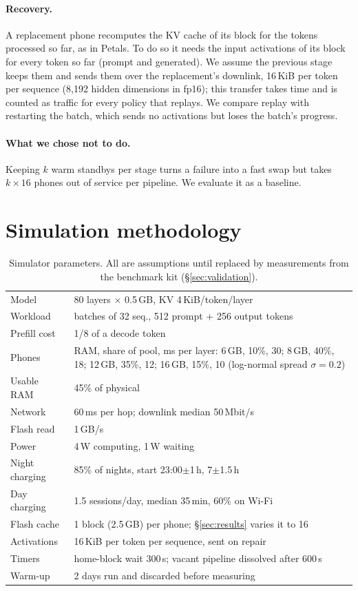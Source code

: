 \documentclass[sigconf,nonacm]{acmart}
\begin{document}
\paragraph{Recovery.} A replacement phone recomputes the KV cache of its block
for the tokens processed so far, as in Petals. To do so it needs the input
activations of its block for every token so far (prompt and generated). We
assume the previous stage keeps them and sends them over the replacement's
downlink, 16\,KiB per token per sequence (8,192 hidden dimensions in fp16);
this transfer takes time and is counted as traffic for every policy that
replays. We compare replay with restarting the batch, which sends no
activations but loses the batch's progress.

\paragraph{What we chose not to do.} Keeping $k$ warm standbys per stage turns a
failure into a fast swap but takes $k\times16$ phones out of service per
pipeline. We evaluate it as a baseline.

\section{Simulation methodology}
\label{sec:method}

\begin{table}[t]
\caption{Simulator parameters. All are assumptions until replaced by
measurements from the benchmark kit (\S\ref{sec:validation}).}
\label{tab:params}
\small
\begin{tabular}{@{}p{}p{}@{}}
\toprule
Model & 80 layers $\times$ 0.5\,GB, KV 4\,KiB/token/layer\\
Workload & batches of 32 seq., 512 prompt + 256 output tokens\\
Prefill cost & 1/8 of a decode token\\
Phones & RAM, share of pool, ms per layer: 6\,GB, 10\%, 30; 8\,GB, 40\%, 18; 12\,GB, 35\%, 12; 16\,GB, 15\%, 10 (log-normal spread $\sigma{=}0.2$)\\
Usable RAM & 45\% of physical\\
Network & 60\,ms per hop; downlink median 50\,Mbit/s\\
Flash read & 1\,GB/s\\
Power & 4\,W computing, 1\,W waiting\\
Night charging & 85\% of nights, start 23:00$\pm$1\,h, 7$\pm$1.5\,h\\
Day charging & 1.5 sessions/day, median 35\,min, 60\% on Wi-Fi\\
Flash cache & 1 block (2.5\,GB) per phone; \S\ref{sec:results} varies it to 16\\
Activations & 16\,KiB per token per sequence, sent on repair\\
Timers & home-block wait 300\,s; vacant pipeline dissolved after 600\,s\\
Warm-up & 2 days run and discarded before measuring\\
\bottomrule
\end{tabular}
\end{table}
\end{document}
